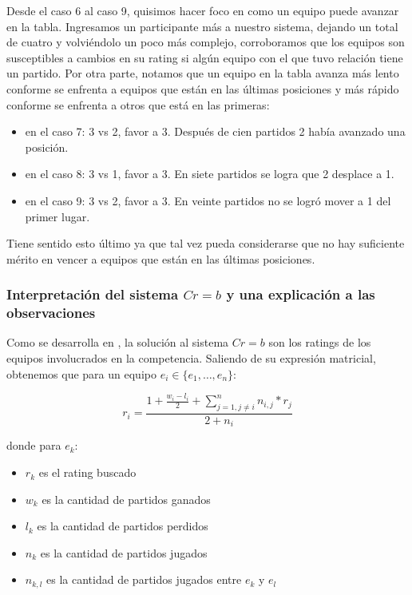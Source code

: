 Desde el caso 6 al caso 9, quisimos hacer foco en como un equipo puede avanzar en la tabla. Ingresamos un participante más a nuestro sistema, dejando un total de cuatro y volviéndolo un poco más complejo, corroboramos que los equipos son susceptibles a cambios en su rating si algún equipo con el que tuvo relación tiene un partido. Por otra parte, notamos que un equipo en la tabla avanza más lento conforme se enfrenta a equipos que están en las últimas posiciones y más rápido conforme se enfrenta a otros que está en las primeras:

\begin{itemize}
    \item en el caso 7: 3 vs 2, favor a 3. Después de cien partidos 2 había avanzado una posición.
    \item en el caso 8: 3 vs 1, favor a 3. En siete partidos se logra que 2 desplace a 1.
    \item en el caso 9: 3 vs 2, favor a 3. En veinte partidos no se logró mover a 1 del primer lugar.
\end{itemize}

Tiene sentido esto último ya que tal vez pueda considerarse que no hay suficiente mérito en vencer a equipos que están en las últimas posiciones.

\subsubsection{Interpretación del sistema $Cr = b$ y una explicación a las observaciones}\label{interpretacion_sistema}

Como se desarrolla en \cite{CMMpaper}, la solución al sistema $Cr = b$ son los ratings de los equipos involucrados en la competencia. Saliendo de su expresión matricial, obtenemos que para un equipo $e_i \in \{e_1, \dots, e_n\}$:

\begin{equation}
    r_i = \frac{1 + \frac{w_i - l_i}{2} + \sum_{j=1, j \neq i}^{n}{n_{i,j} * r_j}}{2 + n_i}    
\end{equation}

donde para $e_k$:

\begin{itemize}
    \item $r_k$ es el rating buscado
    \item $w_k$ es la cantidad de partidos ganados
    \item $l_k$ es la cantidad de partidos perdidos
    \item $n_k$ es la cantidad de partidos jugados
    \item $n_{k,l}$ es la cantidad de partidos jugados entre $e_k$ y $e_l$ 
\end{itemize}

